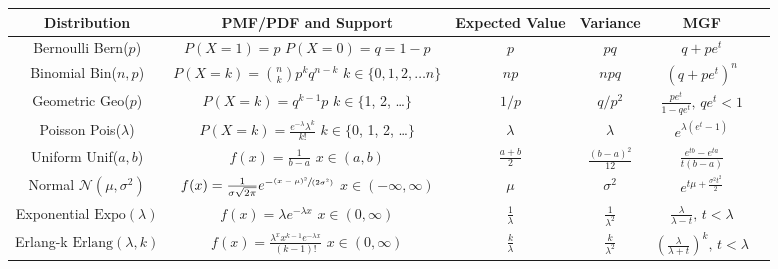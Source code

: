 \documentclass[10pt,landscape]{article}
\newcommand{\N}{\mathcal{N}}
\newcommand{\Bern}{\textrm{Bern}}
\newcommand{\Bin}{\textrm{Bin}}
\newcommand{\Expo}{\textrm{Expo}}
\newcommand{\Pois}{\textrm{Pois}}
\newcommand{\Unif}{\textrm{Unif}}
\newcommand{\Geo}{\textrm{Geo}}
\begin{document}
\begin{center}
\renewcommand{\arraystretch}{3.7}
\begin{tabular}{cccccc}
\textbf{Distribution} & \textbf{PMF/PDF and Support} & \textbf{Expected Value}  & \textbf{Variance} & \textbf{MGF}\\
\hline 
\shortstack{Bernoulli \\ \Bern($p$)} & \shortstack{$P(X=1) = p$ \\$ P(X=0) = q=1-p$} & $p$ & $pq$ & $q + pe^t$ \\
\hline
\shortstack{Binomial \\ \Bin($n, p$)} & \shortstack{$P(X=k) = {n \choose k}p^k q^{n-k}$  \\ $k \in \{0, 1, 2, \dots n\}$}& $np$ & $npq$ & $(q + pe^t)^n$ \\
\hline
\shortstack{Geometric \\ \Geo($p$)} & \shortstack{$P(X=k) = q^{k-1}p$  \\ $k \in \{$1, 2, \dots $\}$}& $1/p$ & $q/p^2$ & $\frac{pe^t}{1-qe^t}, \, qe^t < 1$\\
\hline
\hline
\shortstack{Poisson \\ \Pois($\lambda$)} & \shortstack{$P(X=k) = \frac{e^{-\lambda}\lambda^k}{k!}$ \\ $k \in \{$0, 1, 2, \dots $\}$} & $\lambda$ & $\lambda$ & $e^{\lambda(e^t-1)}$ \\
\hline
\hline
\shortstack{Uniform \\ \Unif($a, b$)} & \shortstack{$ f(x) = \frac{1}{b-a}$ \\$ x \in (a, b) $} & $\frac{a+b}{2}$ & $\frac{(b-a)^2}{12}$ &  $\frac{e^{tb}-e^{ta}}{t(b-a)}$\\
\hline
\shortstack{Normal \\ $\N(\mu, \sigma^2)$} & \shortstack{$f(x) = \frac{1}{\sigma \sqrt{2\pi}} e^{-\sfrac{(x - \mu)^2}{(2 \sigma^2)}}$ \\ $x \in (-\infty, \infty)$} & $\mu$  & $\sigma^2$ & $e^{t\mu + \frac{\sigma^2t^2}{2}}$\\
\hline
\shortstack{Exponential \\ $\Expo(\lambda)$} & \shortstack{$f(x) = \lambda e^{-\lambda x}$\\$ x \in (0, \infty)$} & $\frac{1}{\lambda}$  & $\frac{1}{\lambda^2}$ & $\frac{\lambda}{\lambda - t}, \, t < \lambda$\\
\hline
\shortstack{Erlang-k \\ $\text{Erlang}(\lambda, k)$} & \shortstack{$f(x) = \frac{\lambda^x x^{k-1} e^{-\lambda x}}{(k-1)!}$\\$ x \in (0, \infty)$} & $\frac{k}{\lambda}$  & $\frac{k}{\lambda^2}$ & $\left(\frac{\lambda}{\lambda + t} \right)^k, \, t < \lambda$\\

\end{tabular}
\end{center}
\end{document}
